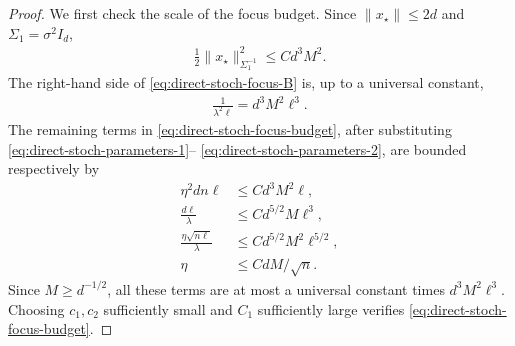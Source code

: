\documentclass{article}
\theoremstyle{plain}
\theoremstyle{definition}
\theoremstyle{plain}
\begin{document}
\begin{proof}
    We first check the scale of the focus budget.  Since
    $\|x_\star\|\leq2d$ and
    $\Sigma_1=\sigma^2I_d$,
    \begin{align}
        \frac12\|x_\star\|_{\Sigma_1^{-1}}^2
        \leq Cd^3M^2.
        \label{eq:direct-stoch-main-initial}
    \end{align}
    The right-hand side of \eqref{eq:direct-stoch-focus-B} is, up to a
    universal constant,
    \begin{align}
        \frac1{\lambda^2\ell}
        =d^3M^2\ell^3.
        \label{eq:direct-stoch-main-focus-size}
    \end{align}
    The remaining terms in
    \eqref{eq:direct-stoch-focus-budget}, after substituting
    \eqref{eq:direct-stoch-parameters-1}--%
    \eqref{eq:direct-stoch-parameters-2}, are bounded respectively by
    \begin{align}
        \eta^2dn\ell
             & \leq C d^3M^2\ell,
        \\
        \frac{d\ell}{\lambda}
             & \leq C d^{5/2}M\ell^3,
        \\
        \frac{\eta\sqrt{n\ell}}{\lambda}
             & \leq C d^{5/2}M^2\ell^{5/2},
        \\
        \eta & \leq C dM/\sqrt n.
    \end{align}
    Since $M\geq d^{-1/2}$, all these terms are at most a universal
    constant times $d^3M^2\ell^3$.  Choosing $c_1,c_2$ sufficiently
    small and $C_1$ sufficiently large verifies
    \eqref{eq:direct-stoch-focus-budget}.


\end{proof}
\end{document}
